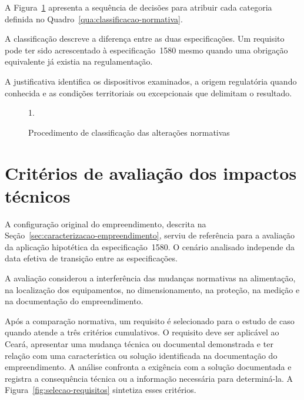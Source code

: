 A Figura~\ref{fig:fluxograma-classificacao-normativa} apresenta a sequência de decisões para atribuir cada categoria definida no Quadro~\ref{qua:classificacao-normativa}.

A classificação descreve a diferença entre as duas especificações. Um requisito pode ter sido acrescentado à especificação~1580 mesmo quando uma obrigação equivalente já existia na regulamentação.

A justificativa identifica os dispositivos examinados, a origem regulatória quando conhecida e as condições territoriais ou excepcionais que delimitam o resultado.

\begin{figure}[p]
  \centering
  \begin{Spacing}{1.}
    \caption{Procedimento de classificação das alterações normativas}
    \label{fig:fluxograma-classificacao-normativa}
  \end{Spacing}
  \noindent\par
\end{figure}
\clearpage

\section{Critérios de avaliação dos impactos técnicos}
\label{sec:impactos}

A configuração original do empreendimento, descrita na Seção~\ref{sec:caracterizacao-empreendimento}, serviu de referência para a avaliação da aplicação hipotética da especificação~1580. O cenário analisado independe da data efetiva de transição entre as especificações.

A avaliação considerou a interferência das mudanças normativas na alimentação, na localização dos equipamentos, no dimensionamento, na proteção, na medição e na documentação do empreendimento.

Após a comparação normativa, um requisito é selecionado para o estudo de caso quando atende a três critérios cumulativos. O requisito deve ser aplicável ao Ceará, apresentar uma mudança técnica ou documental demonstrada e ter relação com uma característica ou solução identificada na documentação do empreendimento. A análise confronta a exigência com a solução documentada e registra a consequência técnica ou a informação necessária para determiná-la. A Figura~\ref{fig:selecao-requisitos} sintetiza esses critérios.

